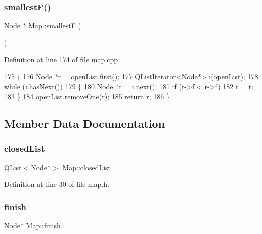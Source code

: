 \subsubsection{\texorpdfstring{smallest\+F()}{smallestF()}}
{\footnotesize\ttfamily \hyperlink{class_node}{Node} $\ast$ Map\+::smallestF (\begin{DoxyParamCaption}{ }\end{DoxyParamCaption})}



Definition at line 174 of file map.\+cpp.


\begin{DoxyCode}
175 \{
176     \hyperlink{class_node}{Node} *r = \hyperlink{class_map_ab19ca30427e7257d713f5fcfa0ac1a10}{openList}.first();
177     QListIterator<Node*> i(\hyperlink{class_map_ab19ca30427e7257d713f5fcfa0ac1a10}{openList});
178     \textcolor{keywordflow}{while} (i.hasNext())
179     \{
180         \hyperlink{class_node}{Node} *t = i.next();
181         \textcolor{keywordflow}{if} (t->\hyperlink{class_node_a32fbe9e0f4fc9e9d1845ce808738d7ab}{f} < r->\hyperlink{class_node_a32fbe9e0f4fc9e9d1845ce808738d7ab}{f})
182             r = t;
183     \}
184     \hyperlink{class_map_ab19ca30427e7257d713f5fcfa0ac1a10}{openList}.removeOne(r);
185     \textcolor{keywordflow}{return} r;
186 \}
\end{DoxyCode}


\subsection{Member Data Documentation}
\mbox{\label{class_map_ae1ced58b787598940bb444659bacd7d3}} 
\subsubsection{\texorpdfstring{closed\+List}{closedList}}
{\footnotesize\ttfamily Q\+List$<$\hyperlink{class_node}{Node}$\ast$$>$ Map\+::closed\+List}



Definition at line 30 of file map.\+h.

\mbox{\label{class_map_abdb357cb53c27be3b6e3c2b54bfde669}} 
\subsubsection{\texorpdfstring{finish}{finish}}
{\footnotesize\ttfamily \hyperlink{class_node}{Node}$\ast$ Map\+::finish}



